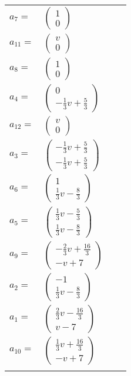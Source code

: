 \documentclass[1p]{elsarticle_modified}
\theoremstyle{definition}
\begin{document}
\begin{tabular}{m{7pt} m{180pt} m{7pt} m{180pt} }
\flushright $a_{7}=$&$\begin{pmatrix}1\\0\end{pmatrix}$ \\
\flushright $a_{11}=$&$\begin{pmatrix}v\\0\end{pmatrix}$ \\
\flushright $a_{8}=$&$\begin{pmatrix}1\\0\end{pmatrix}$ \\
\flushright $a_{4}=$&$\begin{pmatrix}0\\-\frac{1}{3} v+\frac{5}{3}\end{pmatrix}$ \\
\flushright $a_{12}=$&$\begin{pmatrix}v\\0\end{pmatrix}$ \\
\flushright $a_{3}=$&$\begin{pmatrix}-\frac{1}{3} v+\frac{5}{3}\\-\frac{1}{3} v+\frac{5}{3}\end{pmatrix}$ \\
\flushright $a_{6}=$&$\begin{pmatrix}1\\\frac{1}{3} v-\frac{8}{3}\end{pmatrix}$ \\
\flushright $a_{5}=$&$\begin{pmatrix}\frac{1}{3} v-\frac{5}{3}\\\frac{1}{3} v-\frac{8}{3}\end{pmatrix}$ \\
\flushright $a_{9}=$&$\begin{pmatrix}-\frac{2}{3} v+\frac{16}{3}\\- v+7\end{pmatrix}$ \\
\flushright $a_{2}=$&$\begin{pmatrix}-1\\\frac{1}{3} v-\frac{8}{3}\end{pmatrix}$ \\
\flushright $a_{1}=$&$\begin{pmatrix}\frac{2}{3} v-\frac{16}{3}\\v-7\end{pmatrix}$ \\
\flushright $a_{10}=$&$\begin{pmatrix}\frac{1}{3} v+\frac{16}{3}\\- v+7\end{pmatrix}$\\&\end{tabular}
\end{document}

